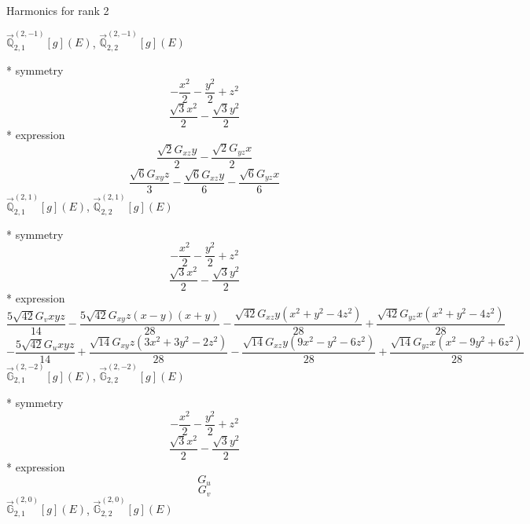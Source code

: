 \documentclass[fleqn,8pt]{jsarticle}
\begin{document}
\noindent * Harmonics for rank 2

\noindent\quad $\vec{\mathbb{Q}}_{2,1}^{(2,-1)}[g](E)$, $\vec{\mathbb{Q}}_{2,2}^{(2,-1)}[g](E)$

\noindent\quad ** symmetry
\begin{dmath*}
- \frac{x^{2}}{2} - \frac{y^{2}}{2} + z^{2}
\end{dmath*}
\begin{dmath*}
\frac{\sqrt{3} x^{2}}{2} - \frac{\sqrt{3} y^{2}}{2}
\end{dmath*}
\noindent\quad ** expression
\begin{dmath*}
\frac{\sqrt{2} G_{xz} y}{2} - \frac{\sqrt{2} G_{yz} x}{2}
\end{dmath*}
\begin{dmath*}
\frac{\sqrt{6} G_{xy} z}{3} - \frac{\sqrt{6} G_{xz} y}{6} - \frac{\sqrt{6} G_{yz} x}{6}
\end{dmath*}
\noindent\quad $\vec{\mathbb{Q}}_{2,1}^{(2,1)}[g](E)$, $\vec{\mathbb{Q}}_{2,2}^{(2,1)}[g](E)$

\noindent\quad ** symmetry
\begin{dmath*}
- \frac{x^{2}}{2} - \frac{y^{2}}{2} + z^{2}
\end{dmath*}
\begin{dmath*}
\frac{\sqrt{3} x^{2}}{2} - \frac{\sqrt{3} y^{2}}{2}
\end{dmath*}
\noindent\quad ** expression
\begin{dmath*}
\frac{5 \sqrt{42} G_{v} x y z}{14} - \frac{5 \sqrt{42} G_{xy} z \left(x - y\right) \left(x + y\right)}{28} - \frac{\sqrt{42} G_{xz} y \left(x^{2} + y^{2} - 4 z^{2}\right)}{28} + \frac{\sqrt{42} G_{yz} x \left(x^{2} + y^{2} - 4 z^{2}\right)}{28}
\end{dmath*}
\begin{dmath*}
- \frac{5 \sqrt{42} G_{u} x y z}{14} + \frac{\sqrt{14} G_{xy} z \left(3 x^{2} + 3 y^{2} - 2 z^{2}\right)}{28} - \frac{\sqrt{14} G_{xz} y \left(9 x^{2} - y^{2} - 6 z^{2}\right)}{28} + \frac{\sqrt{14} G_{yz} x \left(x^{2} - 9 y^{2} + 6 z^{2}\right)}{28}
\end{dmath*}
\noindent\quad $\vec{\mathbb{G}}_{2,1}^{(2,-2)}[g](E)$, $\vec{\mathbb{G}}_{2,2}^{(2,-2)}[g](E)$

\noindent\quad ** symmetry
\begin{dmath*}
- \frac{x^{2}}{2} - \frac{y^{2}}{2} + z^{2}
\end{dmath*}
\begin{dmath*}
\frac{\sqrt{3} x^{2}}{2} - \frac{\sqrt{3} y^{2}}{2}
\end{dmath*}
\noindent\quad ** expression
\begin{dmath*}
G_{u}
\end{dmath*}
\begin{dmath*}
G_{v}
\end{dmath*}
\noindent\quad $\vec{\mathbb{G}}_{2,1}^{(2,0)}[g](E)$, $\vec{\mathbb{G}}_{2,2}^{(2,0)}[g](E)$
\end{document}
